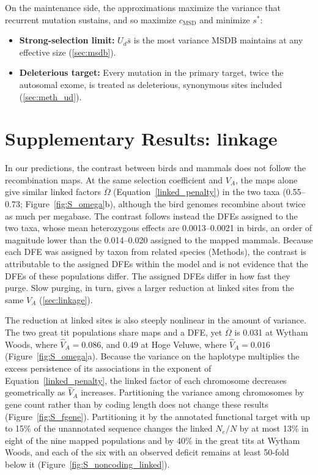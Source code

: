 \documentclass{article}
\begin{document}
On the maintenance side, the approximations maximize the variance that recurrent mutation sustains, and so maximize $c_\text{MSD}$ and minimize $s^*$:
\begin{itemize}
    \item \textbf{Strong-selection limit:} $U_d\bar{s}$ is the most variance MSDB maintains at any effective size (\autoref{sec:msdb}).
    \item \textbf{Deleterious target:} Every mutation in the primary target, twice the autosomal exome, is treated as deleterious, synonymous sites included (\autoref{sec:meth_ud}).
\end{itemize}

\section*{Supplementary Results: linkage}
In our predictions, the contrast between birds and mammals does not follow the recombination maps. At the same selection coefficient and $V_A$, the maps alone give similar linked factors $\overline{\Omega}$ (Equation~\eqref{linked_penalty}) in the two taxa (0.55--0.73; Figure~\ref{fig:S_omega}b), although the bird genomes recombine about twice as much per megabase. The contrast follows instead the DFEs assigned to the two taxa, whose mean heterozygous effects are 0.0013--0.0021 in birds, an order of magnitude lower than the 0.014--0.020 assigned to the mapped mammals. Because each DFE was assigned by taxon from related species (Methods), the contrast is attributable to the assigned DFEs within the model and is not evidence that the DFEs of these populations differ. The assigned DFEs differ in how fast they purge. Slow purging, in turn, gives a larger reduction at linked sites from the same $V_A$ (\autoref{sec:linkage}).

The reduction at linked sites is also steeply nonlinear in the amount of variance. The two great tit populations share maps and a DFE, yet $\overline{\Omega}$ is 0.031 at Wytham Woods, where $\hat{V}_A = 0.086$, and 0.49 at Hoge Veluwe, where $\hat{V}_A = 0.016$ (Figure~\ref{fig:S_omega}a). Because the variance on the haplotype multiplies the excess persistence of its associations in the exponent of Equation~\eqref{linked_penalty}, the linked factor of each chromosome decreases geometrically as $\hat{V}_A$ increases. Partitioning the variance among chromosomes by gene count rather than by coding length does not change these results (Figure~\ref{fig:S_fgene}). Partitioning it by the annotated functional target with up to 15\% of the unannotated sequence changes the linked $N_e/N$ by at most 13\% in eight of the nine mapped populations and by 40\% in the great tits at Wytham Woods, and each of the six with an observed deficit remains at least 50-fold below it (Figure~\ref{fig:S_noncoding_linked}).
\end{document}
